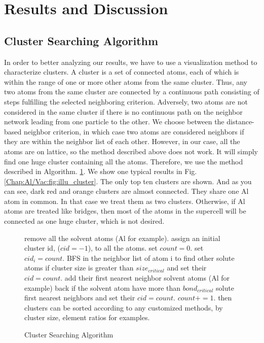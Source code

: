 \section{Results and Discussion}
\label{Chap:Al/Vac:section:RD}
\subsection{Cluster Searching Algorithm}

In order to better analyzing our results, we have to use a visualization method to characterize clusters. A cluster is a set of connected atoms, each of which is within the range of one or more other atoms from the same cluster. Thus, any two atoms from the same cluster are connected by a continuous path consisting of steps fulfilling the selected neighboring criterion. Adversely, two atoms are not considered in the same cluster if there is no continuous path on the neighbor network leading from one particle to the other. We choose between the distance-based neighbor criterion, in which case two atoms are considered neighbors if they are within the neighbor list of each other. However, in our case, all the atoms are on lattice, so the method described above does not work. It will simply find one huge cluster containing all the atoms. Therefore, we use the method described in Algorithm. \ref{algo:cluster}. We show one typical results in Fig. \ref{Chap:Al/Vac:fig:illu_cluster}. The only top ten clusters are shown. And as you can see, dark red and orange clusters are almost connected. They share one Al atom in common. In that case we treat them as two clusters. Otherwise, if Al atoms are treated like bridges, then most of the atoms in the supercell will be connected as one huge cluster, which is not desired.


\begin{figure}[!htb]
  \centering
  \begin{minipage}{.75\linewidth}
    \begin{algorithm}[H]
      \caption{Cluster Searching Algorithm}\label{algo:cluster}
      \begin{algorithmic}[1]
        \State remove all the solvent atoms (Al for example).
        \State assign an initial cluster id, ($cid = -1$), to all the atoms.
        \State set $count = 0$.
            \State set $cid_i = count$.
            \State \ac{BFS} in the neighbor list of atom i to find other solute atoms if cluster size is greater than $size_{critical}$ and set their $cid = count$.
            \State add their first nearest neighbor solvent atoms (Al for example) back if the solvent atom have more than $bond_{critical}$ solute first nearest neighbors and set their $cid = count$.
            \State $count += 1$.
          \EndIf
        \EndFor
        \State then clusters can be sorted according to any customized methods, by cluster size, element ratios for examples.
      \end{algorithmic}
    \end{algorithm}
  \end{minipage}
\end{figure}


